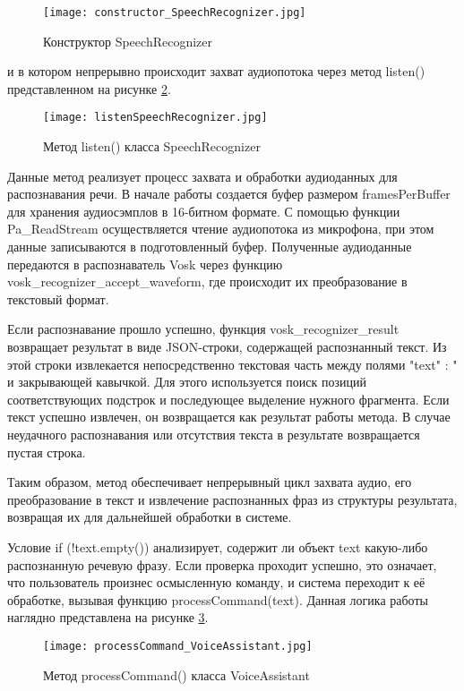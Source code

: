 \begin{figure}[H]
	\centering
	\texttt{[image: constructor\_SpeechRecognizer.jpg]}
	\caption{Конструктор SpeechRecognizer}
		\label{fig:constructor_SpeechRecognizer}
\end{figure}
и в котором непрерывно происходит захват аудиопотока через метод listen() представленном на рисунке \ref{fig:listenSpeechRecognizer}.

\begin{figure}[H]
	\centering
	\texttt{[image: listenSpeechRecognizer.jpg]}
	\caption{Метод listen() класса SpeechRecognizer}
	\label{fig:listenSpeechRecognizer}
\end{figure}

Данные метод реализует процесс захвата и обработки аудиоданных для распознавания речи. В начале работы создается буфер размером framesPerBuffer для хранения аудиосэмплов в 16-битном формате. С помощью функции Pa\_ReadStream осуществляется чтение аудиопотока из микрофона, при этом данные записываются в подготовленный буфер. Полученные аудиоданные передаются в распознаватель Vosk через функцию vosk\_recognizer\_accept\_waveform, где происходит их преобразование в текстовый формат.

Если распознавание прошло успешно, функция vosk\_recognizer\_result возвращает результат в виде JSON-строки, содержащей распознанный текст. Из этой строки извлекается непосредственно текстовая часть между полями \string"text\string" : \string" и закрывающей кавычкой. Для этого используется поиск позиций соответствующих подстрок и последующее выделение нужного фрагмента. Если текст успешно извлечен, он возвращается как результат работы метода. В случае неудачного распознавания или отсутствия текста в результате возвращается пустая строка.

Таким образом, метод обеспечивает непрерывный цикл захвата аудио, его преобразование в текст и извлечение распознанных фраз из структуры результата, возвращая их для дальнейшей обработки в системе.

Условие if (!text.empty()) анализирует, содержит ли объект text какую-либо распознанную речевую фразу. Если проверка проходит успешно, это означает, что пользователь произнес осмысленную команду, и система переходит к её обработке, вызывая функцию processCommand(text). Данная логика работы наглядно представлена на рисунке \ref{fig:processCommand_VoiceAssistant}.

\begin{figure}[H]
	\centering
	\texttt{[image: processCommand\_VoiceAssistant.jpg]}
	\caption{Метод processCommand()  класса VoiceAssistant}
	\label{fig:processCommand_VoiceAssistant}
\end{figure}

